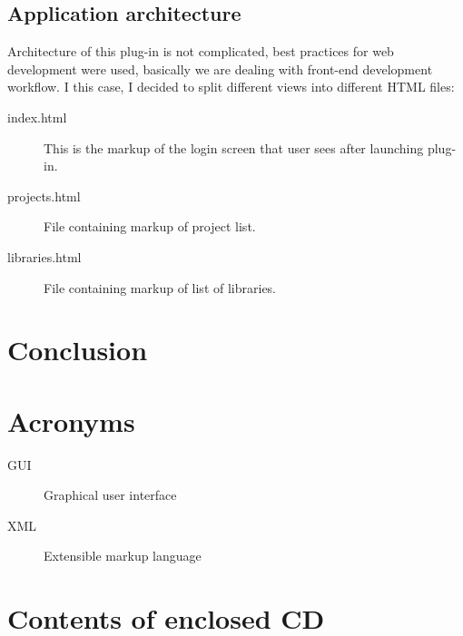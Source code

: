 \documentclass[thesis=B,english]{FITthesis}[2012/10/20]
\begin{document}
\section{Application architecture}
Architecture of this plug-in is not complicated, best practices for web development were used, basically we are dealing with front-end development workflow. I this case, I decided to split different views into different HTML files:
	\begin{description}
		\item [index.html] This is the markup of the login screen that user sees after launching plug-in.
		\item [projects.html] File containing markup of project list.
		\item [libraries.html] File containing markup of list of libraries.
	\end{description}
\chapter{Conclusion}





\appendix

\chapter{Acronyms}
\begin{description}
	\item[GUI] Graphical user interface
	\item[XML] Extensible markup language
\end{description}


\chapter{Contents of enclosed CD}


\begin{figure}
\end{figure}
\end{document}
